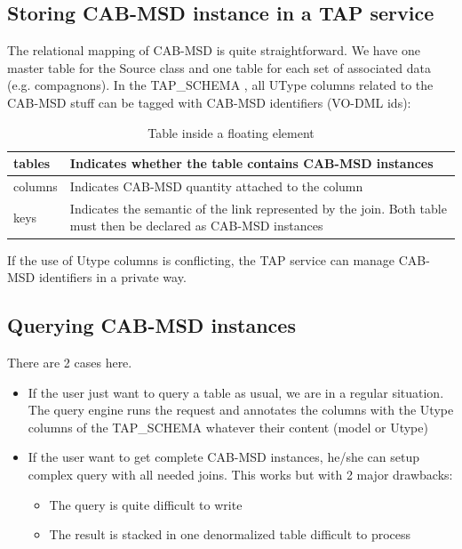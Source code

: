 \documentclass[11pt,a4paper]{ivoa}
\begin{document}
\subsection{Storing CAB-MSD instance in a TAP service}
The relational mapping of CAB-MSD is quite straightforward. We have one master table for the Source class and one table for each set of associated data (e.g. compagnons).
In the TAP\_SCHEMA , all UType columns related to the  CAB-MSD stuff can be tagged with CAB-MSD identifiers (VO-DML ids): 
\begin{table}
\begin{tabular}{|p{9em}|p{20em}|}
 \hline
tables & 
Indicates whether the table contains CAB-MSD instances
\\  
\hline
columns &
Indicates CAB-MSD quantity attached to the column
\\
\hline
keys &
Indicates the semantic of the link represented by the join.
Both table must then be declared as CAB-MSD instances
\\  
\hline
\end{tabular}
\caption{Table inside a floating element}
\label{table:ttap}
\end{table}

If the use of Utype columns is conflicting, the TAP service can manage   CAB-MSD identifiers in a private way.

\subsection{Querying CAB-MSD instances}

There are 2 cases here.
\begin{itemize}
    \item If the user just want to query a table as usual, we are in a regular situation. The query engine runs the request and annotates the columns with the Utype columns of the TAP\_SCHEMA whatever their content (model or Utype)
    \item If the user want to get complete CAB-MSD instances, he/she can setup complex query with all needed joins. This works but with 2 major drawbacks:
    \begin{itemize}
        \item The query is quite difficult to write
        \item The result is stacked in one denormalized table difficult to process
    \end{itemize}
\end{itemize}
\end{document}
